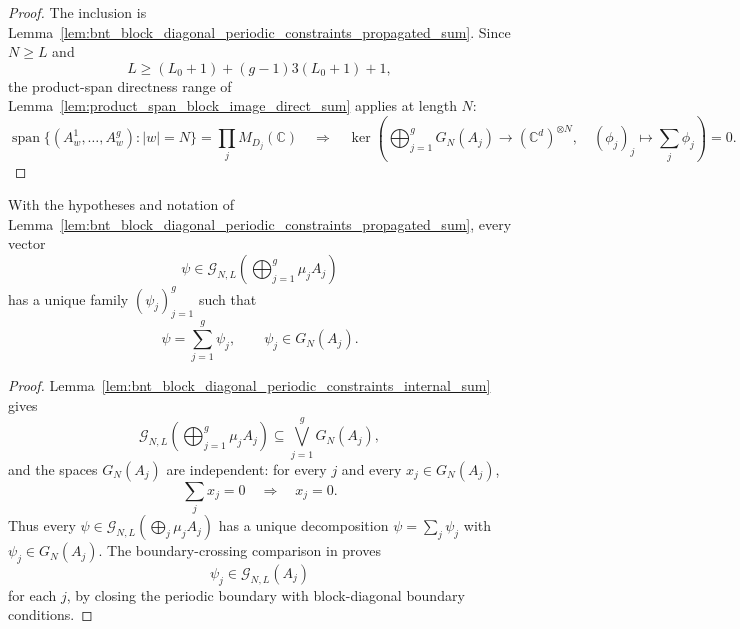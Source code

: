\begin{proof}
    \leanok
    The inclusion is
    Lemma~\ref{lem:bnt_block_diagonal_periodic_constraints_propagated_sum}. Since
    $N\ge L$ and
    \[
        L\ge (L_0+1)+(g-1)3(L_0+1)+1,
    \]
    the product-span directness range of
    Lemma~\ref{lem:product_span_block_image_direct_sum} applies at length
    $N$:
    \[
        \operatorname{span}\{(A^1_w,\ldots,A^g_w): |w|=N\}
        =
        \prod_j M_{D_j}(\mathbb C)
        \quad\Longrightarrow\quad
        \ker\!\left(
        \bigoplus_{j=1}^g G_N(A_j)
        \longrightarrow (\mathbb C^d)^{\otimes N},
        \quad
        (\phi_j)_j\longmapsto \sum_j\phi_j
        \right)=0.
    \]
\end{proof}

\begin{lemma}
    \label{lem:bnt_block_diagonal_open_boundary_decomposition}
    \leanok
    With the hypotheses and notation of
    Lemma~\ref{lem:bnt_block_diagonal_periodic_constraints_propagated_sum}, every
    vector
    \[
        \psi\in
        \mathcal G_{N,L}\!\left(\bigoplus_{j=1}^g\mu_jA_j\right)
    \]
    has a unique family \((\psi_j)_{j=1}^g\) such that
    \[
        \psi=\sum_{j=1}^g\psi_j,
        \qquad
        \psi_j\in G_N(A_j).
    \]
\end{lemma}

\begin{proof}
    \leanok
    Lemma~\ref{lem:bnt_block_diagonal_periodic_constraints_internal_sum} gives
    \[
        \mathcal G_{N,L}\!\left(\bigoplus_{j=1}^g\mu_jA_j\right)
        \subseteq
        \bigvee_{j=1}^g G_N(A_j),
    \]
    and the spaces \(G_N(A_j)\) are independent: for every \(j\) and every
    \(x_j\in G_N(A_j)\),
    \[
        \sum_j x_j=0
        \quad\Longrightarrow\quad
        x_j=0.
    \]
    Thus every
    \(\psi\in\mathcal G_{N,L}(\bigoplus_j\mu_jA_j)\) has a unique
    decomposition \(\psi=\sum_j\psi_j\) with \(\psi_j\in G_N(A_j)\).
    The boundary-crossing comparison in
    \cite[Theorem~2blocks.2]{PerezGarcia2007Matrix} proves
    \[
        \psi_j\in\mathcal G_{N,L}(A_j)
    \]
    for each \(j\), by closing the periodic boundary with block-diagonal
    boundary conditions.
\end{proof}

